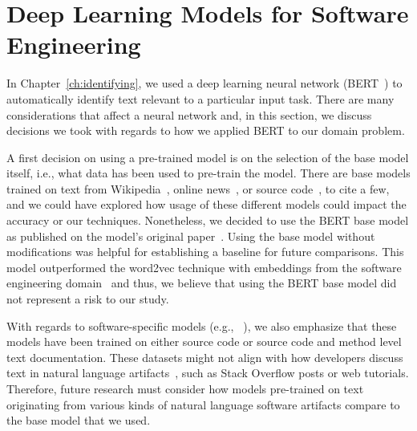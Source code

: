 


\section{Deep Learning Models for Software Engineering}
\label{cp7:deep-learning}




In Chapter~\ref{ch:identifying}, we used a deep learning neural network (BERT~\cite{Devlin2018Bert})
to automatically identify text relevant to a particular input task. There are many considerations 
that affect a neural network and, in this section, we discuss decisions we took 
with regards to how we applied BERT to our domain problem. 



A first decision on using a pre-trained model is on the selection of the base model itself, i.e., what data has been used to pre-train the model. 
There are base models trained on text from Wikipedia~\cite{Devlin2018Bert},  online news~\cite{peters2018elmo}, 
or source code~\cite{feng2020-codebert}, to  cite a few,
and we could have explored how usage of these different models could impact the accuracy or our 
techniques. Nonetheless, we decided to use 
the BERT base model as published on the model's original paper~\cite{Devlin2018Bert}.
Using the base model without modifications
was helpful for establishing a baseline for future comparisons.
This model outperformed 
the word2vec technique with embeddings from the software engineering domain~\cite{Efstathiou2018}
and thus, we believe that using the BERT base model did not represent a risk to our study.




With regards to software-specific models (e.g., ~\cite{feng2020-codebert, li2019neural}), we also emphasize 
that these models have been trained on either source code or source code and method level text documentation. 
These datasets might not align with how developers discuss text in natural language artifacts~\cite{arya2020}, such 
as Stack Overflow posts or web tutorials. Therefore, future research must consider how 
 models pre-trained on text originating from various kinds of 
natural language software artifacts compare to the base model that we used.



